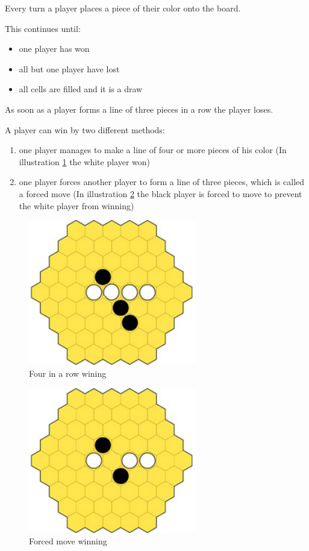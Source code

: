 \documentclass[english]{report} \usepackage[english]{babel}
\begin{document}
Every turn a player places a piece of their color onto the board. 

This continues until:
\begin{itemize}
	\item one player has won
	\item all but one player have lost
	\item all cells are filled and it is a draw
\end{itemize}

As soon as a player forms a line of three pieces in a row the player loses.

A player can win by two different methods:
\begin{enumerate}
	\item one player manages to make a line of four or more pieces of his color (In illustration  \ref{fig:yav_4inarow} the white player won)
	\item one player forces another player to form a line of three pieces, which is called a forced move (In illustration  \ref{fig:yav_forceMove} the black player is forced to move to prevent the white player from winning)
\end{enumerate}

\begin{figure}[H]
\centering
\includegraphics[width=0.65\textwidth]{Abbildungen/yav_4inarow.png}
\caption[Four in a row winning, Source:\cite{yvalath}]{Four in a row wining}
\label{fig:yav_4inarow}
\end{figure}


\begin{figure}[H]
\centering
\includegraphics[width=0.65\textwidth]{Abbildungen/yav_forceMove.png}
\caption[Forced move winning, Source:\cite{yvalath}]{Forced move winning}
\label{fig:yav_forceMove}
\end{figure}
\end{document}
